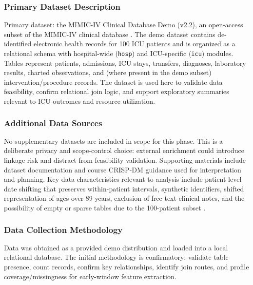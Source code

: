 \documentclass[12pt]{article}
\begin{document}
\subsubsection*{Primary Dataset Description}
Primary dataset: the MIMIC-IV Clinical Database Demo (v2.2), an open-access subset of the MIMIC-IV clinical database \cite{PhysioNet-mimic-iv-demo-2.2,Goldberger2000PhysioNet}. The demo dataset contains de-identified electronic health records for 100 ICU patients and is organized as a relational schema with hospital-wide (\texttt{hosp}) and ICU-specific (\t\texttt{icu}) modules. Tables represent patients, admissions, ICU stays, transfers, diagnoses, laboratory results, charted observations, and (where present in the demo subset) intervention/procedure records. The dataset is used here to validate data feasibility, confirm relational join logic, and support exploratory summaries relevant to ICU outcomes and resource utilization.

\subsubsection*{Additional Data Sources}
No supplementary datasets are included in scope for this phase. This is a deliberate privacy and scope-control choice: external enrichment could introduce linkage risk and distract from feasibility validation. Supporting materials include dataset documentation and course CRISP-DM guidance used for interpretation and planning.
Key data characteristics relevant to analysis include patient-level date shifting that preserves within-patient intervals, synthetic identifiers, shifted representation of ages over 89 years, exclusion of free-text clinical notes, and the possibility of empty or sparse tables due to the 100-patient subset \cite{PhysioNet-mimic-iv-demo-2.2}.

\subsubsection*{Data Collection Methodology}
Data was obtained as a provided demo distribution and loaded into a local relational database. The initial methodology is confirmatory: validate table presence, count records, confirm key relationships, identify join routes, and profile coverage/missingness for early-window feature extraction.

\setlength{\LTleft}{0pt}
\setlength{\LTright}{0pt}

\begingroup
\footnotesize
\setlength{\tabcolsep}{4pt}
\renewcommand{\arraystretch}{1.15}
\end{document}

